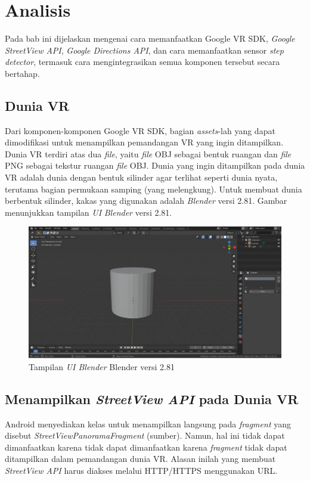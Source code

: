 \chapter{Analisis}
\label{chap:analisis}
Pada bab ini dijelaskan mengenai cara memanfaatkan Google VR SDK, \textit{Google StreetView API}, \textit{Google Directions API}, dan cara memanfaatkan sensor \textit{step detector}, termasuk cara mengintegrasikan semua komponen tersebut secara bertahap. 

\section{Dunia VR}
Dari komponen-komponen Google VR SDK, bagian \textit{assets}-lah yang dapat dimodifikasi untuk menampilkan pemandangan VR yang ingin ditampilkan. Dunia VR terdiri atas dua \textit{file}, yaitu \textit{file} OBJ sebagai bentuk ruangan dan \textit{file} PNG sebagai tekstur ruangan \textit{file} OBJ. Dunia yang ingin ditampilkan pada dunia VR adalah dunia dengan bentuk silinder agar terlihat seperti dunia nyata, terutama bagian permukaan samping (yang melengkung). Untuk membuat dunia berbentuk silinder, kakas yang digunakan adalah \textit{Blender} versi 2.81. Gambar menunjukkan tampilan \textit{UI} \textit{Blender} versi 2.81.

\begin{figure}[h]
	\centering
		\includegraphics[scale=0.4]{Gambar/blender.png}
	\caption{Tampilan \textit{UI Blender} Blender versi 2.81}
	\label{fig:blender-ui}
\end{figure}


\section{Menampilkan \textit{StreetView API} pada Dunia VR}
Android menyediakan kelas untuk menampilkan langsung pada \textit{fragment} yang disebut \textit{StreetViewPanoramaFragment} (sumber). Namun, hal ini tidak dapat dimanfaatkan karena tidak dapat dimanfaatkan karena \textit{fragment} tidak dapat ditampilkan dalam pemandangan dunia VR. Alasan inilah yang membuat \textit{StreetView API} harus diakses melalui HTTP/HTTPS menggunakan URL. 

